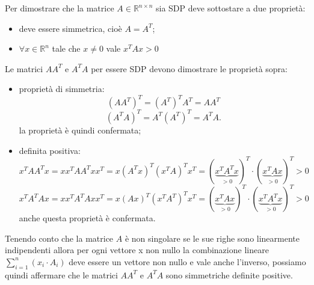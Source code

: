 \begin{flushleft}
Per dimostrare che la matrice $A \in \mathbb{R}^{n \times n}$ sia SDP deve sottostare a due proprietà:
\begin{itemize}
    \item
    deve essere simmetrica, cioè $A=A^T$;
    \item 
    $\forall x \in \mathbb{R}^n$ tale che $x \neq 0$ vale $x^TAx>0$
\end{itemize}
Le matrici $AA^T$ e $A^TA$ per essere SDP devono dimostrare le proprietà sopra:
\begin{itemize}
    \item proprietà di simmetria:
    \[
    (AA^T)^T = (A^T)^TA^T = AA^T
    \]
    \[
    (A^TA)^T = A^T(A^T)^T = A^TA.
    \]
    la proprietà è quindi confermata;
    \item definita positiva:
    \[
    x^TAA^Tx = xx^TAA^Txx^T = x(A^Tx)^T(x^TA)^Tx^T = (\underbrace{x^TA^Tx}_{>0})^T \cdot (\underbrace{x^TAx}_{>0})^T > 0
    \]
    \[
    x^TA^TAx = xx^TA^TAxx^T = x(Ax)^T(x^TA^T)^Tx^T = (\underbrace{x^TAx}_{>0})^T \cdot (\underbrace{x^TA^Tx}_{>0})^T > 0
    \]
    anche questa proprietà è confermata.
\end{itemize}
Tenendo conto che la matrice $A$ è non singolare se le sue righe sono linearmente indipendenti allora per ogni vettore x non nullo la combinazione lineare $\sum_{i=1}^{n} (x_i\cdot A_i)$ deve essere un vettore non nullo e vale anche l'inverso, possiamo quindi affermare che le matrici $AA^T$ e $A^TA$ sono simmetriche definite positive.
\end{flushleft}